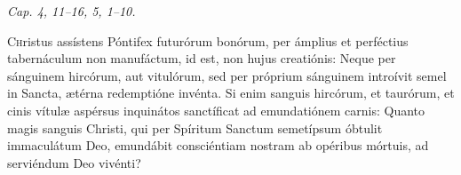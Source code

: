 
{\hfill \textit{Cap. 4, 11–16, 5, 1–10.}} 



\lettrine{C}{h}ristus assístens Póntifex futurórum bonórum, per ámplius et perféctius tabernáculum non manufáctum, id est, non hujus creatiónis:
Neque per sánguinem hircórum, aut vitulórum, sed per próprium sánguinem introívit semel in Sancta, ætérna redemptióne invénta.
Si enim sanguis hircórum, et taurórum, et cinis vítulæ aspérsus inquinátos sanctíficat ad emundatiónem carnis:
Quanto magis sanguis Christi, qui per Spíritum Sanctum semetípsum óbtulit immaculátum Deo, emundábit consciéntiam nostram ab opéribus mórtuis, ad serviéndum Deo vivénti?